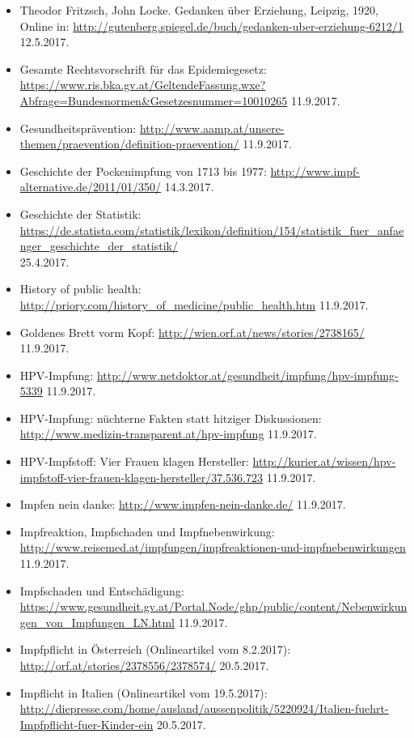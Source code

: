 \documentclass[
    a4paper,
    12pt,
    hyphens,
    chapterprefix=true,
    headheight=33pt,
    footheight=29pt,
    headings=optiontohead,
]{scrartcl}
\begin{document}
{\begin{itemize}
\item{Theodor Fritzsch, John Locke. Gedanken über Erziehung, Leipzig, 1920, Online in: \url{http://gutenberg.spiegel.de/buch/gedanken-uber-erziehung-6212/1} 12.5.2017.}
\item{Gesamte Rechtsvorschrift für das Epidemiegesetz: \url{https://www.ris.bka.gv.at/GeltendeFassung.wxe?Abfrage=Bundesnormen&Gesetzesnummer=10010265} 11.9.2017.}
\item{Gesundheitsprävention: \url{http://www.aamp.at/unsere-themen/praevention/definition-praevention/} 11.9.2017.}
\item{Geschichte der Pockenimpfung von 1713 bis 1977: \url{http://www.impf-alternative.de/2011/01/350/} 14.3.2017.}
\item{Geschichte der Statistik: \url{https://de.statista.com/statistik/lexikon/definition/154/statistik_fuer_anfaenger_geschichte_der_statistik/} \\25.4.2017.}
\item{History of public health: \url{http://priory.com/history_of_medicine/public_health.htm} 11.9.2017.}
\item{Goldenes Brett vorm Kopf: \url{http://wien.orf.at/news/stories/2738165/} \\11.9.2017.}
\item{HPV-Impfung: \url{http://www.netdoktor.at/gesundheit/impfung/hpv-impfung-5339} 11.9.2017.}
\item{HPV-Impfung: nüchterne Fakten statt hitziger Diskussionen: \url{http://www.medizin-transparent.at/hpv-impfung} 11.9.2017.}
\item{HPV-Impfstoff: Vier Frauen klagen Hersteller: \url{http://kurier.at/wissen/hpv-impfstoff-vier-frauen-klagen-hersteller/37.536.723} 11.9.2017.}
\item{Impfen nein danke: \url{http://www.impfen-nein-danke.de/} 11.9.2017.}
\item{Impfreaktion, Impfschaden und Impfnebenwirkung: \url{http://www.reisemed.at/impfungen/impfreaktionen-und-impfnebenwirkungen} 11.9.2017.}
\item{Impfschaden und Entschädigung: \url{https://www.gesundheit.gv.at/Portal.Node/ghp/public/content/Nebenwirkungen_von_Impfungen_LN.html} 11.9.2017.}
\item{Impfpflicht in Österreich (Onlineartikel vom 8.2.2017): \url{http://orf.at/stories/2378556/2378574/} 20.5.2017.}
\item{Impflicht in Italien (Onlineartikel vom 19.5.2017): \url{http://diepresse.com/home/ausland/aussenpolitik/5220924/Italien-fuehrt-Impfpflicht-fuer-Kinder-ein} 20.5.2017.}

\end{itemize}}
\end{document}
